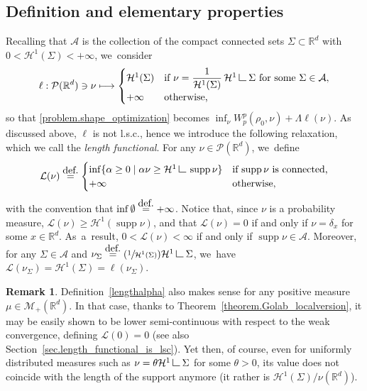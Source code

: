 \documentclass[11pt]{article}
\numberwithin{equation}{section}
\newcommand\mto{\mathchoice{\longmapsto}{\mapsto}{\mapsto}{\mapsto}}
\newcommand{\Psfrac}[2]{(\sfrac{#1}{#2})}
\theoremstyle{definition}
\newtheorem{remark}[theorem]{Remark}
\newcommand{\eqdef}{\ensuremath{\stackrel{\mbox{\upshape\tiny def.}}{=}}}
\newcommand\LM[1]{\hbox{\vrule width.5pt \vbox to#1pt{\vfill \hrule width#1pt height.5pt}}}
\newcommand\LL{{\mathchoice {\>\LM7\>}{\>\LM7\>}{\,\LM5\,}{\,\LM{3.35}\,}}}
\newcommand{\mres}{\LL}
\newcommand\cH{\mathcal{H}}
\newcommand{\RR}{\mathbb{R}}
\DeclareMathOperator{\supp}{supp}
\newcommand{\enscond}[2]{\{#1 \mid #2\} }
\begin{document}
\subsection{Definition and elementary properties}\label{subsec.deflength}
Recalling that $\mathcal{A}$ is the collection of the compact connected sets $\Sigma \subset \RR^d$ with $0<\cH^1(\Sigma)<+\infty$, we~consider
\begin{equation}\label{eq:defl}
\ell : \mathcal{P}(\RR^d) \ni \nu \mto
\begin{cases}
\cH^1(\Sigma) & \text{if $\nu=\dfrac{1}{\cH^1(\Sigma)}\,\cH^1\mres \Sigma$ for some $\Sigma \in \mathcal{A}$},\\
+\infty& \text{otherwise,}
\end{cases}
\end{equation}
so that \eqref{problem.shape_optimization} becomes $\inf_\nu W_p^p(\rho_0, \nu) + \Lambda\ell(\nu)$. As discussed above, $\ell$ is not l.s.c., hence we introduce the following relaxation, which we call the \emph{length functional}. For any $\nu \in \mathcal{P}(\RR^d)$, we~define
\begin{equation}
\mathcal{L}(\nu)
\eqdef
\begin{cases}
\inf \enscond{\alpha \ge 0}{\alpha \nu \ge \cH^1\mres \supp \nu} & \mbox{if $\supp \nu$ is connected,}\\
+\infty & \mbox{otherwise,}
\end{cases}\label{lengthalpha}
\end{equation}
with the convention that $\inf \emptyset \eqdef +\infty$. Notice that, since $\nu$ is a probability measure, $\mathcal{L}(\nu)\geq \cH^1(\supp \nu)$, and that $\mathcal{L}(\nu)=0$ if and only if $\nu = \delta_x$ for some $x \in \RR^d$. As~a~result, $0<\mathcal{L}(\nu) < \infty$ if and only if $\supp \nu \in \mathcal{A}$. Moreover, for any $\Sigma \in \mathcal{A}$ and $ \nu_\Sigma\eqdef\Psfrac{1}{\cH^1(\Sigma)} \cH^1\mres \Sigma$, we~have $\mathcal{L}(\nu_\Sigma) = \cH^1(\Sigma)=\ell(\nu_\Sigma)$.

\begin{remark}
Definition~\eqref{lengthalpha} also makes sense for any positive measure $\mu \in \mathcal{M}_+(\RR^d)$. In that case, thanks to Theorem~\ref{theorem.Golab_localversion}, it may be easily shown to be
lower semi-continuous with respect to the weak convergence,
defining $\mathcal{L}(0)=0$ (see also Section~\ref{sec.length_functional_is_lsc}).
Yet then, of course, even for uniformly distributed measures such as $\nu = \theta\cH^1\mres \Sigma$ for some $\theta> 0$, its value does not coincide with the length of the support anymore (it rather is $\cH^1(\Sigma)/\nu(\RR^d)$).
\end{remark}
\end{document}
